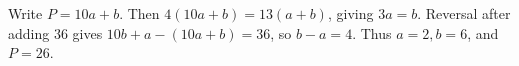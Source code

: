 Write $P=10a+b$. Then $4(10a+b)=13(a+b)$, giving $3a=b$. Reversal after adding $36$ gives $10b+a-(10a+b)=36$, so $b-a=4$. Thus $a=2,b=6$, and $\boxed{P=26}$.
